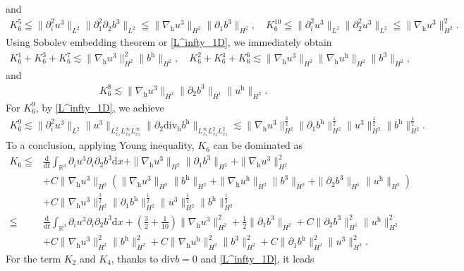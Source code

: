 \documentclass[11pt]{amsart}
\theoremstyle{definition}
\newcommand{\R}{\mathbb{R}}
\newcommand{\h}{\mathrm{h}}
\newcommand{\nablah}{\nabla_{\mathrm{h}}}
\numberwithin{equation}{section}
\begin{document}
and
\begin{align*}
	K^{5}_{6}\leqq\|\partial_{i}^2u^3\|_{L^2}\|\partial_1^2\partial_{2}b^3\|_{L^2}\leqq\|\nablah u^3\|_{H^2}\|\partial_1b^3\|_{H^2} ,\quad
	K^{10}_{6}\leqq \|\partial_{i}^2u^3\|_{L^2}\|\partial_2^2u^3\|_{L^2}\leqq \|\nablah u^3\|_{H^2}^2.
\end{align*}
Using Sobolev embedding theorem or \eqref{L^infty_1D}, we immediately obtain
\begin{align*}
	K^{1}_{6}+K^{3}_{6}+K^{7}_{6}\lesssim \|\nablah u^3\|_{H^2}^2\|b^\h\|_{H^2},\quad 	K^{2}_{6}+K^{4}_{6}+K^{6}_{6}\lesssim \|\nablah u^3\|_{H^2}\|\nablah u^\h\|_{H^2}\|b^3\|_{H^2},
\end{align*}
and
\begin{align*}
	K^{8}_{6}\lesssim \|\nablah u^3\|_{H^2}\| \partial_{2}b^3\|_{H^1}\|u^\h\|_{H^2}.
\end{align*}
For $K^{9}_{6}$, by \eqref{L^infty_1D}, we achieve
\begin{align*}
	K^{9}_{6}\lesssim\|\partial_{i}^2u^3\|_{L^2}\|u^3\|_{L^2_{x_1}L^\infty_{x_2}L^\infty_{x_3}}\| \partial_{2}\mathrm{div_h}b^\h\|_{L^\infty_{x_1}L^{2}_{x_2}L^{2}_{x_3}}
	\lesssim\|\nablah u^3\|_{H^{2}}^\frac32\|\partial_1b^\h\|_{H^2}^\frac12\|u^3\|_{H^2}^\frac12\|b^\h\|_{H^2}^\frac12.
\end{align*}
To a conclusion, applying Young inequality, $K_6$ can be dominated as
\begin{align}\label{K6}
	K_{6}\leqq&\frac{\mathrm{d}}{\mathrm{d}t}\int_{\R^3}\partial_{i}u^3\partial_{i}\partial_{2}b^3\mathrm{d}x+\|\nablah u^3\|_{H^2}\|\partial_1b^3\|_{H^2} + \|\nablah u^3\|_{H^2}^2\nonumber\\
	&+ C\|\nablah u^3\|_{H^2}\left(\|\nablah u^3\|_{H^2}\|b^\h\|_{H^2}+\|\nablah u^\h\|_{H^2}\|b^3\|_{H^2}+\| \partial_{2}b^3\|_{H^1}\|u^\h\|_{H^2}\right)\nonumber\\
	&+C\|\nablah u^3\|_{H^{2}}^\frac32\|\partial_1b^\h\|_{H^2}^\frac12\|u^3\|_{H^2}^\frac12\|b^\h\|_{H^2}^\frac12\nonumber\\
	\leqq&\frac{\mathrm{d}}{\mathrm{d}t}\int_{\R^3}\partial_{i}u^3\partial_{i}\partial_{2}b^3\mathrm{d}x+(\frac32+\frac{1}{10})\|\nablah u^3\|_{H^2}^2+\frac12\|\partial_1b^3\|_{H^2}+C\| \partial_{2}b^3\|_{H^1}^2\|u^\h\|_{H^2}^2\nonumber\\
	&+ C\|\nablah u^3\|_{H^2}^2\|b^\h\|_{H^2}^2+C\|\nablah u^\h\|_{H^2}^2\|b^3\|_{H^2}^2+C\|\partial_1b^\h\|_{H^2}^2\|u^3\|_{H^2}^2.
\end{align}
For the term $K_{2}$ and $K_4$, thanks to $\mathrm{div}b=0$ and \eqref{L^infty_1D}, it leads
\end{document}
